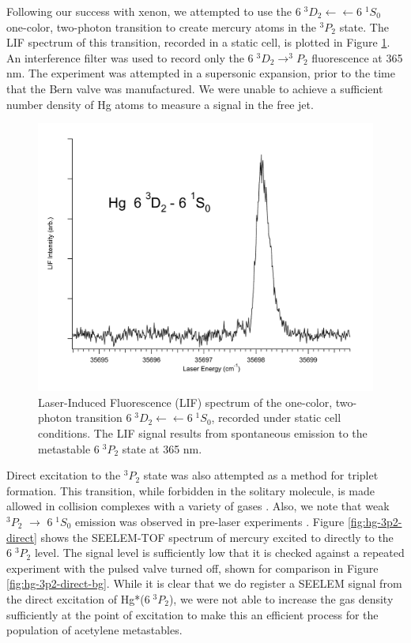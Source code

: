 Following our success with xenon, we attempted to use the $6\;^3D_2
\leftarrow \leftarrow 6\;^1S_0$ one-color, two-photon transition to
create mercury atoms in the $^3P_2$ state.  The LIF spectrum of this
transition, recorded in a static cell, is plotted in Figure
\ref{fig:hg3d2-cell}.  An interference filter was used to record only
the $6 \; ^3D_2 \rightarrow ^3P_2$ fluorescence at 365 nm.  The
experiment was attempted in a supersonic expansion, prior to the time
that the Bern valve was manufactured.  We were unable to achieve a
sufficient number density of Hg atoms to measure a signal in the free
jet.

\begin{figure}
  \caption{Laser-Induced Fluorescence (LIF) spectrum of the one-color,
    two-photon transition  $6\;^3D_2 \leftarrow \leftarrow
    6\;^1S_0$, recorded under static cell conditions.  The LIF signal
    results from spontaneous emission to the metastable $6\;^3P_2$
    state at 365 nm.}
  \label{fig:hg3d2-cell}
  \centering
  \vspace{1cm}
  \includegraphics[width=6in]{Hg3D2-cell.pdf}
  \vspace{1cm}
\end{figure}

Direct excitation to the $^3P_2$ state was also attempted as a method
for triplet formation.  This transition, while forbidden in the
solitary molecule, is made allowed in collision complexes with a
variety of gases \cite{kurosawa98, amano98}.  Also, we note that weak
$^3P_2$ $\rightarrow$ $6 \; ^1S_0$ emission was observed in pre-laser
experiments \cite{mrozowski45}.  Figure \ref{fig:hg-3p2-direct} shows
the SEELEM-TOF spectrum of mercury excited to directly to the $6 \;
^3P_2$ level.  The signal level is sufficiently low that it is checked
against a repeated experiment with the pulsed valve turned off, shown
for comparison in Figure \ref{fig:hg-3p2-direct-bg}.  While it is
clear that we do register a SEELEM signal from the direct excitation
of Hg*($6 \; ^3P_2$), we were not able to increase the gas density
sufficiently at the point of excitation to make this an efficient
process for the population of acetylene metastables.

